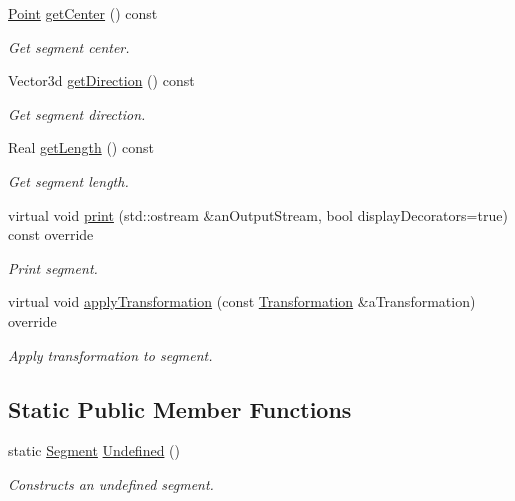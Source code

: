 \begin{DoxyCompactItemize}
\hyperlink{classlibrary_1_1math_1_1geom_1_1d3_1_1objects_1_1_point}{Point} \hyperlink{classlibrary_1_1math_1_1geom_1_1d3_1_1objects_1_1_segment_a6788da2dd6ee48ded2da197c01ea7f3d}{get\+Center} () const
\begin{DoxyCompactList}\small\item\em Get segment center. \end{DoxyCompactList}\item 
Vector3d \hyperlink{classlibrary_1_1math_1_1geom_1_1d3_1_1objects_1_1_segment_afc15a855d660d67e96467466c4442bbc}{get\+Direction} () const
\begin{DoxyCompactList}\small\item\em Get segment direction. \end{DoxyCompactList}\item 
Real \hyperlink{classlibrary_1_1math_1_1geom_1_1d3_1_1objects_1_1_segment_a16b011c680e3102b8b44e6c88ffff81d}{get\+Length} () const
\begin{DoxyCompactList}\small\item\em Get segment length. \end{DoxyCompactList}\item 
virtual void \hyperlink{classlibrary_1_1math_1_1geom_1_1d3_1_1objects_1_1_segment_a2d3c1a17842ee4ee83cffda33911291d}{print} (std\+::ostream \&an\+Output\+Stream, bool display\+Decorators=true) const override
\begin{DoxyCompactList}\small\item\em Print segment. \end{DoxyCompactList}\item 
virtual void \hyperlink{classlibrary_1_1math_1_1geom_1_1d3_1_1objects_1_1_segment_a63c7017391bcc0e67f4d97311e7ebdb2}{apply\+Transformation} (const \hyperlink{classlibrary_1_1math_1_1geom_1_1d3_1_1_transformation}{Transformation} \&a\+Transformation) override
\begin{DoxyCompactList}\small\item\em Apply transformation to segment. \end{DoxyCompactList}\end{DoxyCompactItemize}
\subsection*{Static Public Member Functions}
\begin{DoxyCompactItemize}
\item 
static \hyperlink{classlibrary_1_1math_1_1geom_1_1d3_1_1objects_1_1_segment}{Segment} \hyperlink{classlibrary_1_1math_1_1geom_1_1d3_1_1objects_1_1_segment_a3b2505e9553ba0067f8184120c106602}{Undefined} ()
\begin{DoxyCompactList}\small\item\em Constructs an undefined segment. \end{DoxyCompactList}\end{DoxyCompactItemize}


